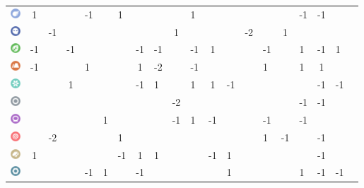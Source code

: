\begin{table}[h]
\begin{center}
\begin{tabular}{c c g c g c g c g c g c g c g c g c g c}
    \includegraphics[width=1em]{images/flying.png} & 1 & & & -1 & & 1 & & & & 1 & & & & & & -1 & -1 & \\ %
    \includegraphics[width=1em]{images/ghost.png} & & -1 & & & & & & & 1 & & & & -2 & & 1 & &  & \\ %
    \includegraphics[width=1em]{images/grass.png} & -1 & & -1 & & & & -1 & -1 & & -1 & 1 & & & -1 & & 1 & -1 & 1 \\ %
    \includegraphics[width=1em]{images/ground.png} & -1 & & & 1 & & & 1 & -2 & & -1 & & & & 1 & & 1 & 1 & \\ %
    \includegraphics[width=1em]{images/ice.png} & & & 1 & & & & -1 & 1 & & 1 & 1 & -1 & & & & & -1 & -1 \\ %
    \includegraphics[width=1em]{images/normal.png} & & & & & & & & & -2 & & & & & & & -1 & -1 & \\ %
    \includegraphics[width=1em]{images/poison.png} & & & &  & 1 &  & &  &  -1 & 1 & -1 & & & -1 & & -1 & & \\ %
    \includegraphics[width=1em]{images/psychic.png} & & -2 & &  & & 1 & & &  & & & & & 1 & -1 & & -1 & &  \\ %
    \includegraphics[width=1em]{images/rock.png} & 1 &  &  & &  & -1 & 1 & 1 &  &  & -1 & 1 & & &  & & -1 & \\ %
    \includegraphics[width=1em]{images/steel.png} & & & & -1 & 1 & & -1 & & & & & 1 & & & & 1 & -1 & -1 \\ %

\end{tabular}
\end{center}
\end{table}
